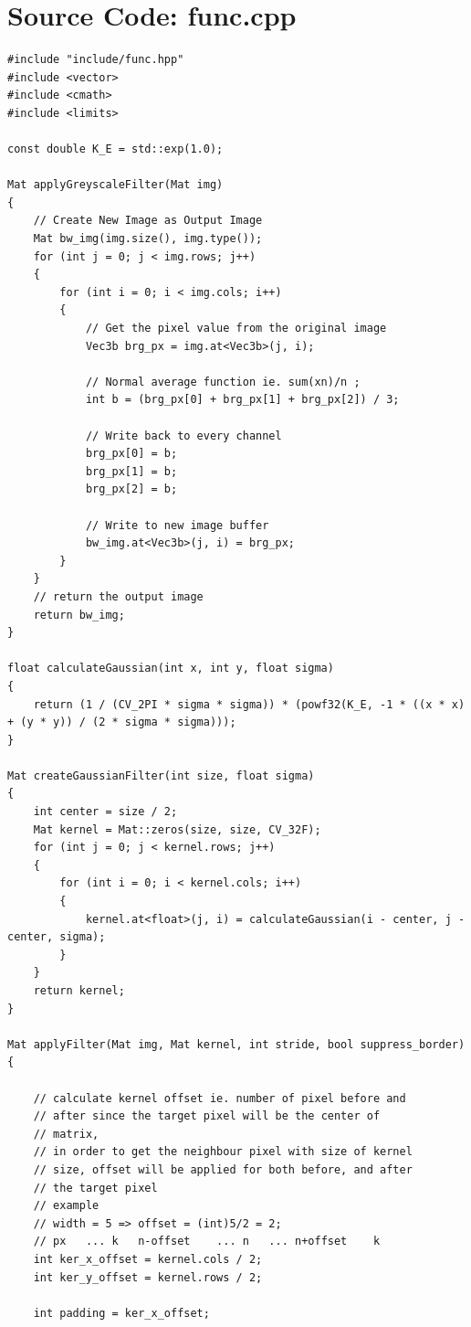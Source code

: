 \documentclass[12pt,a4paper]{report}
\begin{document}
\chapter{Source Code: func.cpp}
\begin{lstlisting}
#include "include/func.hpp"
#include <vector>
#include <cmath>
#include <limits>

const double K_E = std::exp(1.0);

Mat applyGreyscaleFilter(Mat img)
{
    // Create New Image as Output Image
    Mat bw_img(img.size(), img.type());
    for (int j = 0; j < img.rows; j++)
    {
        for (int i = 0; i < img.cols; i++)
        {
            // Get the pixel value from the original image
            Vec3b brg_px = img.at<Vec3b>(j, i);

            // Normal average function ie. sum(xn)/n ;
            int b = (brg_px[0] + brg_px[1] + brg_px[2]) / 3;

            // Write back to every channel
            brg_px[0] = b;
            brg_px[1] = b;
            brg_px[2] = b;

            // Write to new image buffer
            bw_img.at<Vec3b>(j, i) = brg_px;
        }
    }
    // return the output image
    return bw_img;
}

float calculateGaussian(int x, int y, float sigma)
{
    return (1 / (CV_2PI * sigma * sigma)) * (powf32(K_E, -1 * ((x * x) + (y * y)) / (2 * sigma * sigma)));
}

Mat createGaussianFilter(int size, float sigma)
{
    int center = size / 2;
    Mat kernel = Mat::zeros(size, size, CV_32F);
    for (int j = 0; j < kernel.rows; j++)
    {
        for (int i = 0; i < kernel.cols; i++)
        {
            kernel.at<float>(j, i) = calculateGaussian(i - center, j - center, sigma);
        }
    }
    return kernel;
}

Mat applyFilter(Mat img, Mat kernel, int stride, bool suppress_border)
{

    // calculate kernel offset ie. number of pixel before and
    // after since the target pixel will be the center of
    // matrix,
    // in order to get the neighbour pixel with size of kernel
    // size, offset will be applied for both before, and after
    // the target pixel
    // example
    // width = 5 => offset = (int)5/2 = 2;
    // px   ... k   n-offset    ... n   ... n+offset    k
    int ker_x_offset = kernel.cols / 2;
    int ker_y_offset = kernel.rows / 2;

    int padding = ker_x_offset;


\end{lstlisting}
\end{document}
